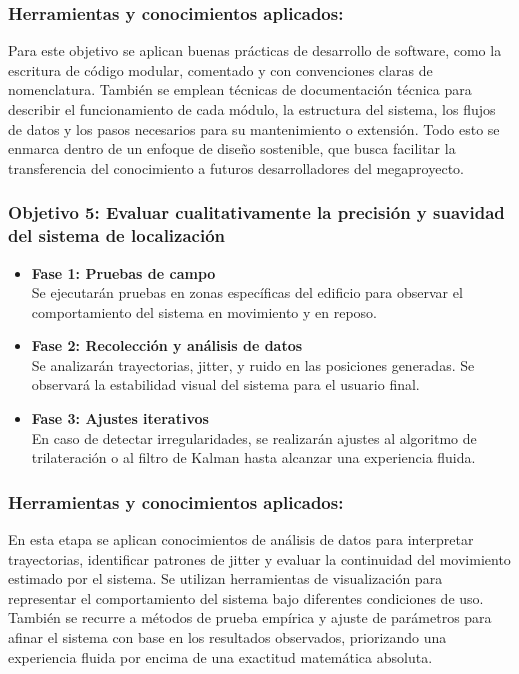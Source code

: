 \subsubsection{Herramientas y conocimientos aplicados:} 
{\justify Para este objetivo se aplican buenas prácticas de desarrollo de software, como la escritura de código modular, comentado y con convenciones claras de nomenclatura. También se emplean técnicas de documentación técnica para describir el funcionamiento de cada módulo, la estructura del sistema, los flujos de datos y los pasos necesarios para su mantenimiento o extensión. Todo esto se enmarca dentro de un enfoque de diseño sostenible, que busca facilitar la transferencia del conocimiento a futuros desarrolladores del megaproyecto.}

\subsubsection{Objetivo 5: Evaluar cualitativamente la precisión y suavidad del sistema de localización}

\begin{itemize}
    \item \textbf{Fase 1: Pruebas de campo} \\
    Se ejecutarán pruebas en zonas específicas del edificio para observar el comportamiento del sistema en movimiento y en reposo.

    \item \textbf{Fase 2: Recolección y análisis de datos} \\
    Se analizarán trayectorias, jitter, y ruido en las posiciones generadas. Se observará la estabilidad visual del sistema para el usuario final.

    \item \textbf{Fase 3: Ajustes iterativos} \\
    En caso de detectar irregularidades, se realizarán ajustes al algoritmo de trilateración o al filtro de Kalman hasta alcanzar una experiencia fluida.
\end{itemize}

\subsubsection{Herramientas y conocimientos aplicados:} 
{\justify En esta etapa se aplican conocimientos de análisis de datos para interpretar trayectorias, identificar patrones de jitter y evaluar la continuidad del movimiento estimado por el sistema. Se utilizan herramientas de visualización para representar el comportamiento del sistema bajo diferentes condiciones de uso. También se recurre a métodos de prueba empírica y ajuste de parámetros para afinar el sistema con base en los resultados observados, priorizando una experiencia fluida por encima de una exactitud matemática absoluta.}

